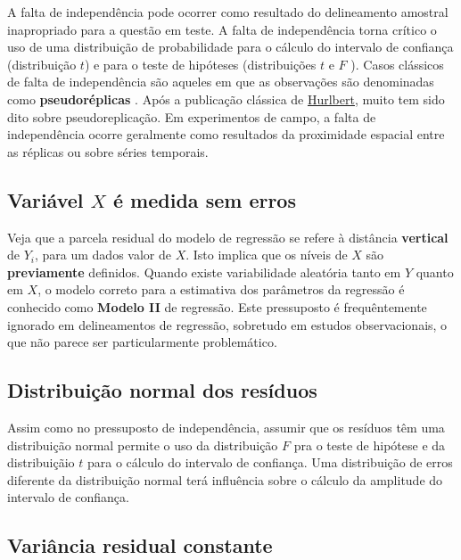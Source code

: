 \documentclass[
]{book}
\begin{document}
A falta de independência pode ocorrer como resultado do delineamento amostral inapropriado para a questão em teste. A falta de independência torna crítico o uso de uma distribuição de probabilidade para o cálculo do intervalo de confiança (distribuição \(t\)) e para o teste de hipóteses (distribuições \(t\) e \(F\) ). Casos clássicos de falta de independência são aqueles em que as observações são denominadas como \textbf{pseudoréplicas} \citep{hurlbert1984pseudoreplication}. Após a publicação clássica de \href{https://esajournals.onlinelibrary.wiley.com/doi/abs/10.2307/1942661}{Hurlbert}, muito tem sido dito sobre pseudoreplicação. Em experimentos de campo, a falta de independência ocorre geralmente como resultados da proximidade espacial entre as réplicas ou sobre séries temporais.

\hypertarget{variuxe1vel-x-uxe9-medida-sem-erros}{%
\subsection{\texorpdfstring{Variável \(X\) é medida sem erros}{Variável X é medida sem erros}}\label{variuxe1vel-x-uxe9-medida-sem-erros}}

Veja que a parcela residual do modelo de regressão se refere à distância \textbf{vertical} de \(Y_i\), para um dados valor de \(X\). Isto implica que os níveis de \(X\) são \textbf{previamente} definidos. Quando existe variabilidade aleatória tanto em \(Y\) quanto em \(X\), o modelo correto para a estimativa dos parâmetros da regressão é conhecido como \textbf{Modelo II} de regressão. Este pressuposto é frequêntemente ignorado em delineamentos de regressão, sobretudo em estudos observacionais, o que não parece ser particularmente problemático.

\hypertarget{distribuiuxe7uxe3o-normal-dos-resuxedduos}{%
\subsection{Distribuição normal dos resíduos}\label{distribuiuxe7uxe3o-normal-dos-resuxedduos}}

Assim como no pressuposto de independência, assumir que os resíduos têm uma distribuição normal permite o uso da distribuição \(F\) pra o teste de hipótese e da distribuiçãio \(t\) para o cálculo do intervalo de confiança. Uma distribuição de erros diferente da distribuição normal terá influência sobre o cálculo da amplitude do intervalo de confiança.

\hypertarget{variuxe2ncia-residual-constante}{%
\subsection{Variância residual constante}\label{variuxe2ncia-residual-constante}}
\end{document}
